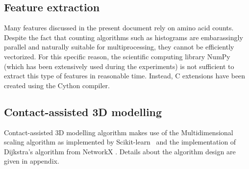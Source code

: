   \subsection{Feature extraction}

    Many features discussed in the present document rely on amino acid counts.
    Despite the fact that counting algorithms such as histograms are embarassingly parallel
    and naturally suitable for multiprocessing, they cannot be efficiently vectorized.
    For this specific reason, the scientific computing library NumPy (which has been extensively
    used during the experiments) is not sufficient to extract this type of features in reasonable
    time. Instead, C extensions have been created using the Cython compiler\cite{behnel2010cython}.

  \subsection{Contact-assisted 3D modelling}

    Contact-assisted 3D modelling algorithm makes use of the Multidimensional scaling algorithm
    as implemented by Scikit-learn~\cite{scikit-learn} and the implementation of Dijkstra's
    algorithm from NetworkX .
    Details about the algorithm design are given in appendix.
